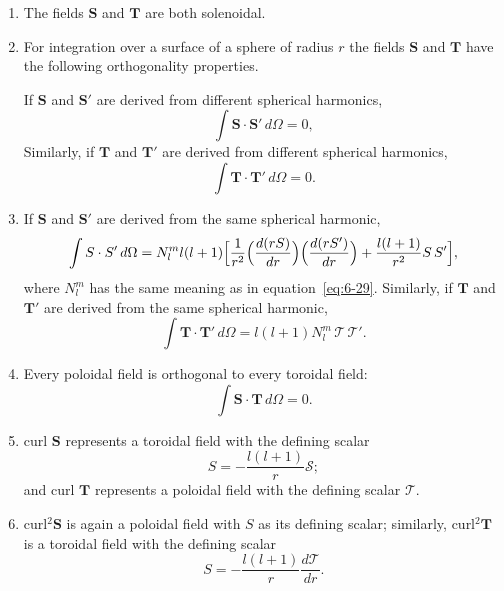 \begin{enumerate}
\item[(i)] The fields $\mathbf{S}$ and $\mathbf{T}$ are both solenoidal.
\item[(ii)] For integration over a surface of a sphere of radius $r$ the fields
$\mathbf{S}$ and $\mathbf{T}$ have the following orthogonality properties.

If $\mathbf{S}$ and $\mathbf{S}'$ are derived from different spherical harmonics,
\begin{equation}\label{eq:6-51}
\int \mathbf{S}\cdot\mathbf{S}'\,d\Omega = 0,
\end{equation}
Similarly, if $\mathbf{T}$ and $\mathbf{T}'$ are derived from
different spherical harmonics,
\begin{equation}\label{eq:6-52}
\int \mathbf{T}\cdot\mathbf{T}'\,d\Omega = 0.
\end{equation}

\item[(iii)] If $\mathbf{S}$ and $\mathbf{S}'$ are derived from the same spherical harmonic,
\begin{equation}\label{eq:6-53}
\int \mathbf{S}\cdot\mathbf{S}'\,d\Omega = N_l^m l(l+1)\Bigl[\frac{1}{r^2}\Bigl(\frac{d(r\mathscr{S})}{dr}\Bigr)\Bigl(\frac{d(r\mathscr{S}')}{dr}\Bigr) + \frac{l(l+1)}{r^2}\mathscr{S}\,\mathscr{S}'\Bigr],
\end{equation}
where $N_l^m$ has the same meaning as in equation~\eqref{eq:6-29}. Similarly, if $\mathbf{T}$
and $\mathbf{T}'$ are derived from the same spherical harmonic,
\begin{equation}\label{eq:6-54}
\int \mathbf{T}\cdot\mathbf{T}'\,d\Omega = l(l+1)N_l^m\,\mathscr{T}\,\mathscr{T}'.
\end{equation}

\item[(iv)] Every poloidal field is orthogonal to every toroidal field:
\begin{equation}\label{eq:6-55}
\int \mathbf{S}\cdot\mathbf{T}\,d\Omega = 0.
\end{equation}

\item[(v)] curl $\mathbf{S}$ represents a toroidal field with the defining scalar
\begin{equation}\label{eq:6-56}
S = -\frac{l(l+1)}{r}\mathscr{S};
\end{equation}
and curl $\mathbf{T}$ represents a poloidal field with the defining scalar $\mathscr{T}$.

\item[(vi)] curl$^2\mathbf{S}$ is again a poloidal field with $S$ as its defining scalar;
similarly, curl$^2\mathbf{T}$ is a toroidal field with the defining scalar
\begin{equation}\label{eq:6-57}
S = -\frac{l(l+1)}{r}\frac{d\mathscr{T}}{dr}.
\end{equation}
\end{enumerate}


